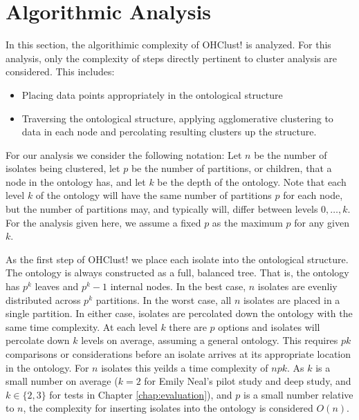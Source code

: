 \documentclass[12pt]{ucthesis}
\begin{document}
   \section{Algorithmic Analysis}\label{sec:algorithm_analysis}
      In this section, the algorithimic complexity of \textsf{OHClust!} is
      analyzed. For this analysis, only the complexity of steps directly
      pertinent to cluster analysis are considered. This includes:
      \begin{itemize}
         \item Placing data points appropriately in the ontological structure
         \item Traversing the ontological structure, applying agglomerative
               clustering to data in each node and percolating resulting
               clusters up the structure.
      \end{itemize}
      For our analysis we consider the following notation: Let $n$ be the
      number of isolates being clustered, let $p$ be the number of partitions,
      or children, that a node in the ontology has, and let $k$ be the depth of
      the ontology. Note that each level $k$ of the ontology will have the same
      number of partitions $p$ for each node, but the number of partitions may,
      and typically will, differ between levels $0, \ldots, k$. For the
      analysis given here, we assume a fixed $p$ as the maximum $p$ for any
      given $k$.

      As the first step of \textsf{OHClust!} we place each isolate into the
      ontological structure. The ontology is always constructed as a full,
      balanced tree. That is, the ontology has $p^{k}$ leaves and $p^{k} - 1$
      internal nodes. In the best case, $n$ isolates are evenliy distributed
      across $p^{k}$ partitions. In the worst case, all $n$ isolates are placed
      in a single partition. In either case, isolates are percolated down the
      ontology with the same time complexity. At each level $k$ there are $p$
      options and isolates will percolate down $k$ levels on average, assuming
      a general ontology. This requires $pk$ comparisons or
      considerations before an isolate arrives at its appropriate location in
      the ontology. For $n$ isolates this yeilds a time complexity of $npk$. As
      $k$ is a small number on average ($k=2$ for Emily Neal's pilot study and
      deep study, and $k \in \{2, 3\}$ for tests in Chapter
      \ref{chap:evaluation}), and $p$ is a small number relative to $n$, the
      complexity for inserting isolates into the ontology is considered
      $O(n)$.
\end{document}
